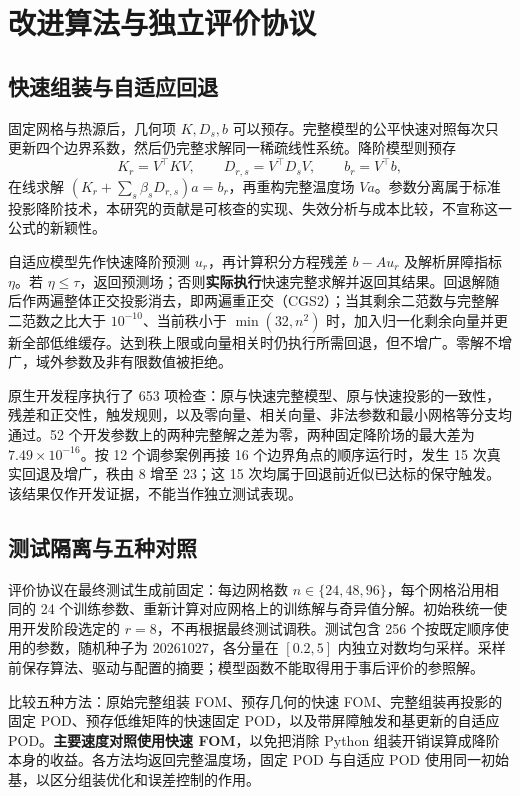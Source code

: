 \section{改进算法与独立评价协议}
\subsection{快速组装与自适应回退}
固定网格与热源后，几何项 $K,D_s,b$ 可以预存。完整模型的公平快速对照每次只更新四个边界系数，然后仍完整求解同一稀疏线性系统。降阶模型则预存
\[
 K_r=V^\top KV,\qquad D_{r,s}=V^\top D_sV,\qquad b_r=V^\top b,
\]
在线求解 $(K_r+\sum_s\beta_sD_{r,s})a=b_r$，再重构完整温度场 $Va$。参数分离属于标准投影降阶技术，本研究的贡献是可核查的实现、失效分析与成本比较，不宣称这一公式的新颖性。

自适应模型先作快速降阶预测 $u_r$，再计算积分方程残差 $b-Au_r$ 及解析屏障指标 $\eta$。若 $\eta\leq\tau$，返回预测场；否则\textbf{实际执行}快速完整求解并返回其结果。回退解随后作两遍整体正交投影消去，即两遍重正交（CGS2）；当其剩余二范数与完整解二范数之比大于 $10^{-10}$、当前秩小于 $\min(32,n^2)$ 时，加入归一化剩余向量并更新全部低维缓存。达到秩上限或向量相关时仍执行所需回退，但不增广。零解不增广，域外参数及非有限数值被拒绝。

原生开发程序执行了 653 项检查：原与快速完整模型、原与快速投影的一致性，残差和正交性，触发规则，以及零向量、相关向量、非法参数和最小网格等分支均通过。52 个开发参数上的两种完整解之差为零，两种固定降阶场的最大差为 $7.49\times10^{-16}$。按 12 个调参案例再接 16 个边界角点的顺序运行时，发生 15 次真实回退及增广，秩由 8 增至 23；这 15 次均属于回退前近似已达标的保守触发。该结果仅作开发证据，不能当作独立测试表现。

\subsection{测试隔离与五种对照}
评价协议在最终测试生成前固定：每边网格数 $n\in\{24,48,96\}$，每个网格沿用相同的 24 个训练参数、重新计算对应网格上的训练解与奇异值分解。初始秩统一使用开发阶段选定的 $r=8$，不再根据最终测试调秩。测试包含 256 个按既定顺序使用的参数，随机种子为 20261027，各分量在 $[0.2,5]$ 内独立对数均匀采样。采样前保存算法、驱动与配置的摘要；模型函数不能取得用于事后评价的参照解。

比较五种方法：原始完整组装 FOM、预存几何的快速 FOM、完整组装再投影的固定 POD、预存低维矩阵的快速固定 POD，以及带屏障触发和基更新的自适应 POD。\textbf{主要速度对照使用快速 FOM}，以免把消除 Python 组装开销误算成降阶本身的收益。各方法均返回完整温度场，固定 POD 与自适应 POD 使用同一初始基，以区分组装优化和误差控制的作用。

